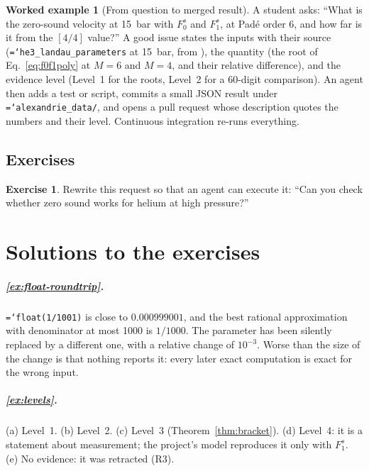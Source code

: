 \documentclass[11pt,a4paper,openany]{book}
\newcommand{\Fzs}{F_0^{s}}
\newcommand{\Fos}{F_1^{s}}
\newcommand{\code}[1]{\texttt{\hyphenchar\font=`\-\relax #1}}
\theoremstyle{definition}
\newtheorem{example}{Worked example}[chapter]
\newtheorem{exercise}{Exercise}[chapter]
\theoremstyle{plain}
\begin{document}
\begin{example}[From question to merged result]
\label{ex:request}
A student asks: ``What is the zero-sound velocity at 15~bar with $\Fzs$ and $\Fos$, at Padé order
6, and how far is it from the $[4/4]$ value?'' A good issue states the inputs with their source
(\code{he3\_landau\_parameters} at 15~bar, from \cite{kollar2000}), the quantity (the root of
Eq.~\eqref{eq:f0f1poly} at $M=6$ and $M=4$, and their relative difference), and the evidence level
(Level~1 for the roots, Level~2 for a 60-digit comparison). An agent then adds a test or script,
commits a small JSON result under \code{alexandrie\_data/}, and opens a pull request whose
description quotes the numbers and their level. Continuous integration re-runs everything.
\end{example}

\section*{Exercises}
\begin{exercise}\label{ex:badrequest}
Rewrite this request so that an agent can execute it: ``Can you check whether zero sound works
for helium at high pressure?''
\end{exercise}

\appendix

\chapter{Solutions to the exercises}
\label{app:solutions}

\paragraph{\ref{ex:float-roundtrip}.} \code{float(1/1001)} is close to $0.000999001$, and the best
rational approximation with denominator at most 1000 is $1/1000$. The parameter has been
silently replaced by a different one, with a relative change of $10^{-3}$. Worse than the size of
the change is that nothing reports it: every later exact computation is exact for the wrong
input.

\paragraph{\ref{ex:levels}.} (a) Level~1. (b) Level~2. (c) Level~3 (Theorem~\ref{thm:bracket}).
(d) Level~4: it is a statement about measurement; the project's model reproduces it only with
$\Fos$. (e) No evidence: it was retracted (R3).
\end{document}
